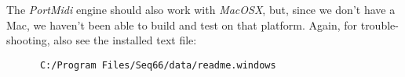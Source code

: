    The \textsl{PortMidi} engine should also work with \textsl{MacOSX}, but,
   since we don't have a Mac, we haven't been able to build and test
   on that platform.
   Again, for trouble-shooting, also see the installed text file:

   \begin{verbatim}
      C:/Program Files/Seq66/data/readme.windows
   \end{verbatim}

